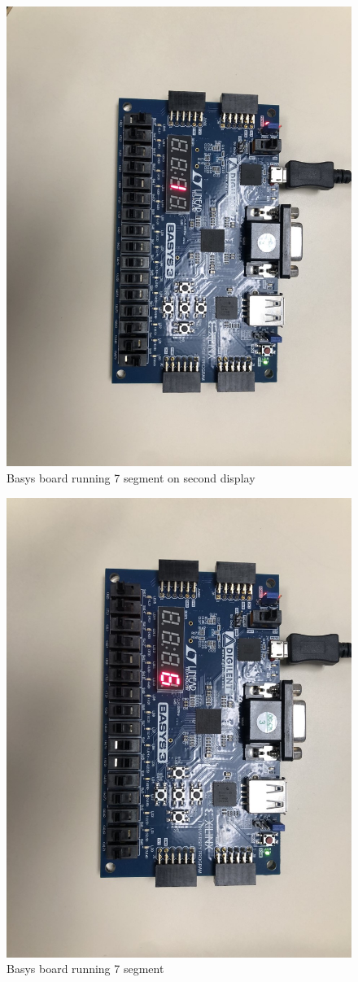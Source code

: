 \documentclass[11pt]{article}
\begin{document}
\begin{figure}
	\includegraphics[width= \textwidth]{basys.png}
	\caption{Basys board running 7 segment on second display }\label{fig:Basys}
\end{figure}
\begin{figure}
	\includegraphics[width= \textwidth]{basys_.png}
	\caption{Basys board running 7 segment }\label{fig:Basys2}
\end{figure}
\end{document}
